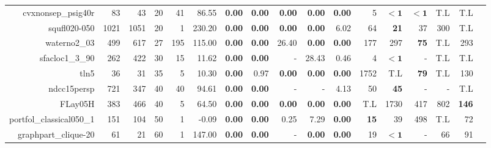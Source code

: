 \begin{table*}[t]
\begin{tabular}{|r|r|r|r|r||r||r|r|r|r|r||r|r|r|r|r|r|}
               cvxnonsep\_psig40r &           83 &           43 &          20 &          41 &             86.55 & \textbf{0.00} &\textbf{0.00} & \textbf{0.00} & \textbf{0.00} & \textbf{0.00} &            5 &         $\bm{< 1}$ &         $\bm{< 1}$ &          T.L &          T.L \\ 
                     squfl020-050 &         1021 &         1051 &          20 &           1 &            230.20 & \textbf{0.00} &\textbf{0.00} & \textbf{0.00} & \textbf{0.00} &          6.02 &           64 &        \textbf{21} &                 37 &          300 &          T.L \\ 
                     waterno2\_03 &          499 &          617 &          27 &         195 &            115.00 & \textbf{0.00} &\textbf{0.00} &         26.40 & \textbf{0.00} & \textbf{0.00} &          177 &                297 &        \textbf{75} &          T.L &          293 \\ 
                  sfacloc1\_3\_90 &          262 &          422 &          30 &          15 &             11.62 & \textbf{0.00} &\textbf{0.00} &             - &         28.43 &          0.46 &            4 &         $\bm{< 1}$ &                  - &          T.L &          T.L \\ 
                             tln5 &           36 &           31 &          35 &           5 &             10.30 & \textbf{0.00} &         0.97 & \textbf{0.00} & \textbf{0.00} & \textbf{0.00} &         1752 &                T.L &        \textbf{79} &          T.L &          130 \\ 
                      ndcc15persp &          721 &          347 &          40 &          40 &             94.61 & \textbf{0.00} &\textbf{0.00} &             - &             - &          4.13 &           50 &        \textbf{45} &                  - &            - &          T.L \\ 
                          FLay05H &          383 &          466 &          40 &           5 &             64.50 & \textbf{0.00} &\textbf{0.00} & \textbf{0.00} & \textbf{0.00} & \textbf{0.00} &          T.L &               1730 &                417 &          802 & \textbf{146} \\ 
         portfol\_classical050\_1 &          151 &          104 &          50 &           1 &             -0.09 & \textbf{0.00} &\textbf{0.00} &          0.25 &          7.29 & \textbf{0.00} &  \textbf{15} &                 39 &                498 &          T.L &           72 \\ 
             graphpart\_clique-20 &           61 &           21 &          60 &           1 &            147.00 & \textbf{0.00} &\textbf{0.00} &             - & \textbf{0.00} & \textbf{0.00} &           19 &         $\bm{< 1}$ &                  - &           66 &           91 \\ 

\end{tabular}
\end{table*}
